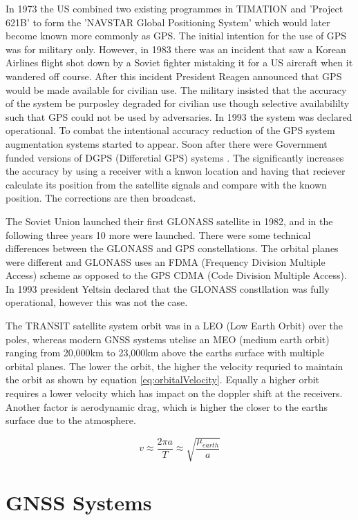 In 1973 the US combined two existing programmes in TIMATION and 'Project 621B' to form the 'NAVSTAR Global Positioning System' which would later become known more
commonly as GPS. The initial intention for the use of GPS was for military only. However, in 1983 there was an incident that saw a Korean Airlines flight shot down by a
Soviet fighter mistaking it for a US aircraft when it wandered off course. After this incident President Reagen announced that GPS would be made available for civilian
use. The military insisted that the accuracy of the system be purposley degraded for civilian use though selective availabililty such that GPS could not be used by
adversaries. In 1993 the system was declared operational. To combat the intentional accuracy reduction of the GPS system augmentation systems started to appear. Soon
after there were Government funded versions of DGPS (Differetial GPS) systems \cite{RN43}. The significantly increases the accuracy by using a receiver with a knwon
location and having that reciever calculate its position from the satellite signals and compare with the known position. The corrections are then broadcast. 

The Soviet Union launched their first GLONASS satellite in 1982, and in the following three years 10 more were launched. There were some technical differences between the
GLONASS and GPS constellations. The orbital planes were different and GLONASS uses an FDMA (Frequency Division Multiple Access) scheme as opposed to the GPS CDMA (Code
Division Multiple Access). In 1993 president Yeltsin declared that the GLONASS constllation was fully operational, however this was not the case. 

The TRANSIT satellite system orbit was in a LEO (Low Earth Orbit) over the poles, whereas modern GNSS systems utelise an MEO (medium earth orbit) ranging from 20,000km to
23,000km above the earths surface with multiple orbital planes.
The lower the orbit, the higher the velocity requried to maintain the orbit as shown by equation \ref{eq:orbitalVelocity}. Equally a higher orbit requires a lower velocity which
has impact on the doppler shift at the receivers. Another factor is aerodynamic drag, which is higher the closer to the earths surface due to the atmosphere.

\begin{equation} \label{eq:orbitalVelocity}
    v \approx \frac{2\pi a}{T} \approx \sqrt{\frac{\mu_{earth}}{a}}
\end{equation} 

\section{GNSS Systems} \label{sec:GNSS}
